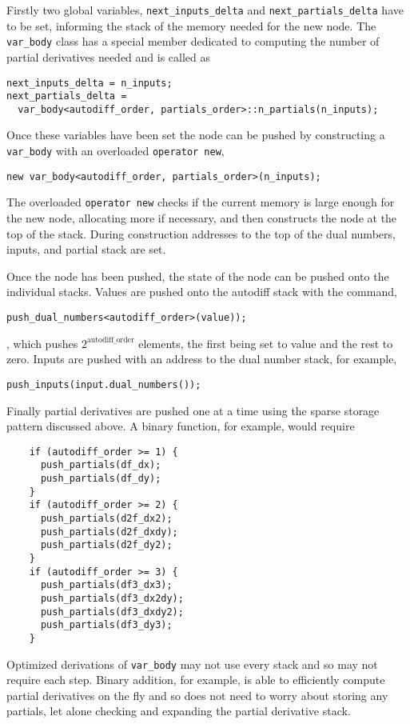 Firstly two global variables, \verb|next_inputs_delta| and 
\verb|next_partials_delta| have to be set, informing the stack of the memory
needed for the new node.  The \verb|var_body| class has a special
member dedicated to computing the number of partial derivatives needed
and is called as
%
\begin{verbatim}
next_inputs_delta = n_inputs;
next_partials_delta =
  var_body<autodiff_order, partials_order>::n_partials(n_inputs);
\end{verbatim}

Once these variables have been set the node can be pushed by constructing
a \verb|var_body| with an overloaded \verb|operator new|,
%
\begin{verbatim}
new var_body<autodiff_order, partials_order>(n_inputs);
\end{verbatim}
%
The overloaded \verb|operator new| checks if the current memory is large 
enough for the new node, allocating more if necessary, and then constructs 
the node at the top of the stack.  During construction addresses to the top of 
the dual numbers, inputs, and partial stack are set.

Once the node has been pushed, the state of the node can be pushed onto
the individual stacks.  Values are pushed onto the autodiff stack with the
command,
%
\begin{verbatim}
push_dual_numbers<autodiff_order>(value));
\end{verbatim},
%
which pushes $2^{\mathrm{autodiff\_order}}$ elements, the first being set to
value and the rest to zero.  Inputs are pushed with an address to the dual
number stack, for example,
%
\begin{verbatim}
push_inputs(input.dual_numbers());
\end{verbatim}
%
Finally partial derivatives are pushed one at a time using the sparse storage
pattern discussed above.  A binary function, for example, would require

%
\begin{verbatim}
    if (autodiff_order >= 1) {
      push_partials(df_dx);
      push_partials(df_dy);
    }
    if (autodiff_order >= 2) {
      push_partials(d2f_dx2);
      push_partials(d2f_dxdy);
      push_partials(d2f_dy2);
    }
    if (autodiff_order >= 3) {
      push_partials(df3_dx3);
      push_partials(df3_dx2dy);
      push_partials(df3_dxdy2);
      push_partials(df3_dy3);
    }
\end{verbatim}

Optimized derivations of \verb|var_body| may not use every stack and so may
not require each step.  Binary addition, for example, is able to efficiently 
compute partial derivatives on the fly and so does not need to worry about
storing any partials, let alone checking and expanding the partial derivative 
stack.

